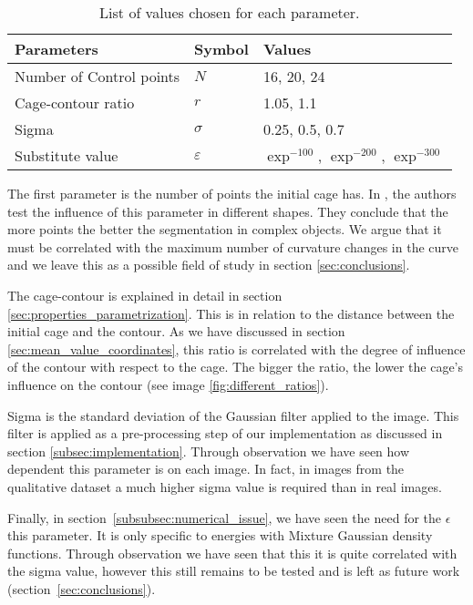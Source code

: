 \begin{table}[h!]
	\centering
	\begin{tabular}{|l|l|l|}
		\hline
		\textbf{Parameters} & \textbf{Symbol}&\textbf{Values}   \\ \hline
		Number of Control points& $N$& 16, 20, 24 \\ \hline
		Cage-contour ratio & $r$ & 1.05, 1.1 \\ \hline
		Sigma & $\sigma$ & 0.25, 0.5, 0.7\\ \hline
		Substitute value~\tablefootnote{This parameter is specific to the Mixture Gaussian Energy}  & $\varepsilon$ & $\exp^{-100}$, $\exp^{-200}$, $\exp^{-300}$\\ \hline
	\end{tabular}
	\caption{List of values chosen for each parameter.}
	\label{table:parameters}
\end{table}

The first parameter is the number of points the initial cage has. In \cite{ipcac2015}, the authors test the influence of this parameter in different shapes. They conclude that the more points the better the segmentation in complex objects. We argue that it must be correlated with the maximum number of curvature changes in the curve and we leave this as a possible field of study in section \ref{sec:conclusions}.

The cage-contour is explained in detail in section \ref{sec:properties_parametrization}. This is in relation to the distance between the initial cage and the contour. As we have discussed in section \ref{sec:mean_value_coordinates}, this ratio is correlated with the degree of influence of the contour with respect to the cage. The bigger the ratio, the lower the cage's influence on the contour (see image \ref{fig:different_ratios}).

Sigma is the standard deviation of the Gaussian filter applied to the image. This filter is applied as a pre-processing step of our implementation as discussed in section \ref{subsec:implementation}. Through observation we have seen how dependent this parameter is on each image. In fact, in images from the qualitative dataset a much higher sigma value is required than in real images.

Finally, in section~\ref{subsubsec:numerical_issue}, we have seen the need for the $\epsilon$ this parameter. It is only specific to energies with Mixture Gaussian density functions. Through observation we have seen that this it is quite correlated with the sigma value, however this still remains to be tested and is left as future work (section~\ref{sec:conclusions}).


